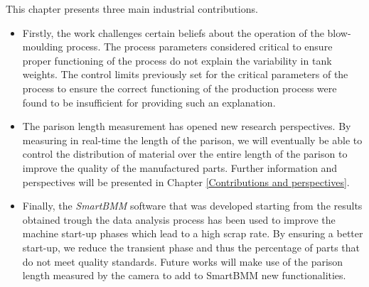 This chapter presents three main industrial contributions.
\begin{itemize}
    \item Firstly, the work challenges certain beliefs about the operation of the blow-moulding process. The process parameters considered critical to ensure proper functioning of the process do not explain the variability in tank weights. The control limits previously set for the critical parameters of the process to ensure the correct functioning of the production process were found to be insufficient for providing such an explanation.
    \item The parison length measurement has opened new research perspectives. By measuring in real-time the length of the parison, we will eventually be able to control the distribution of material over the entire length of the parison to improve the quality of the manufactured parts. Further information and perspectives will be presented in Chapter \ref{Contributions and perspectives}.
    \item Finally, the \textit{SmartBMM} software that was developed starting from the results obtained trough the data analysis process has been used to improve the machine start-up phases which lead to a high scrap rate. By ensuring a better start-up, we reduce the transient phase and thus the percentage of parts that do not meet quality standards. Future works will make use of the parison length measured by the camera to add to SmartBMM new functionalities.  
\end{itemize}

